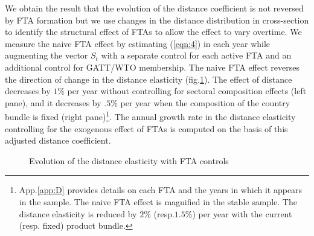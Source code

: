 \documentclass[12pt,twoside,a4paper,notitlepage]{article}
\begin{document}
We obtain the result that the evolution of the distance coefficient is not reversed by FTA formation but we use changes in the distance distribution in cross-section to identify the structural effect of FTAs to allow the effect to vary overtime.
We measure the naive FTA effect by estimating (\ref{eqn:4}) in each year while augmenting the vector $S_t$ with a separate control for each active FTA and an additional control for GATT/WTO membership.
The naive FTA effect reverses the direction of change in the distance elasticity (fig.\ref{fig:ftabench}).
The effect of distance decreases by $1$\% per year without controlling for sectoral composition effects (left pane), and it decreases by $.5$\% per year when the composition of the country bundle is fixed (right pane)\footnote{App.\ref{app:D} provides details on each FTA and the years in which it appears in the sample.
The naive FTA effect is magnified in the stable sample.
The distance elasticity is reduced by $2$\% (resp.$1.5$\%) per year with the current (resp.
fixed) product bundle.}.
The annual growth rate in the distance elasticity controlling for the exogenous effect of FTAs is computed on the basis of this adjusted distance coefficient.


\begin{figure}[h!]
\caption{Evolution of the distance elasticity with FTA controls \label{fig:ftabench}}
\begin{center}
\setlength{\fboxrule}{1pt} %
\setlength{\fboxsep}{.1in} %
\end{center}
\end{figure} 
\end{document}
